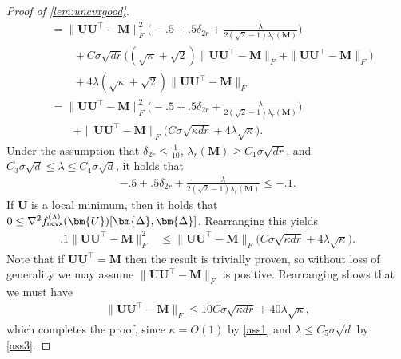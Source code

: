 \documentclass[10pt]{article}
\renewcommand{\t}{^{\top}}
\theoremstyle{definition}
\begin{document}
\begin{proof}[Proof of \cref{lem:uncvxgood}]
\begin{align}
     &= \| \bm{UU}\t - \bm{M} \|_F^2 \bigg( - .5 + .5 \delta_{2r} + \frac{\lambda}{2 (\sqrt{2} - 1) \lambda_r(\bm{M})} \bigg)  \\
     &\qquad + C \sigma \sqrt{dr} \bigg( (\sqrt{\kappa} + \sqrt{2}) \| \bm{UU}\t - \bm{M} \|_F + \| \bm{UU}\t - \bm{M} \|_F\bigg) \\
     &\qquad +  4 \lambda(\sqrt{\kappa} + \sqrt{2}) \| \bm{UU}\t - \bm{M} \|_F \\
     &= \| \bm{UU}\t - \bm{M} \|_F^2 \bigg( - .5 + .5 \delta_{2r} + \frac{\lambda}{2 (\sqrt{2} - 1) \lambda_r(\bm{M})} \bigg) \\
     &\qquad + \| \bm{UU}\t - \bm{M} \|_F \bigg( C \sigma  \sqrt{\kappa dr} +  4 \lambda \sqrt{\kappa} \bigg).
     \end{align}
 Under the assumption that $\delta_{2r} \leq \frac{1}{10}$, $\lambda_r(\bm{M}) \geq C_1 \sigma \sqrt{dr}$, and $C_3 \sigma \sqrt{d} \leq \lambda \leq C_4 \sigma \sqrt{d}$, it holds that
 \begin{align}
     - .5 + .5 \delta_{2r} + \frac{\lambda}{2 (\sqrt{2} - 1) \lambda_r(\bm{M})}  \leq - .1.
 \end{align}
    If $\bm{U}$ is a local minimum, then it holds that $0 \leq \nabla^2 f^{(\lambda)}_{{\sf ncvx}}(\bm{U})[ \bm{\Delta},\bm{\Delta}]$.  
         Rearranging this yields
     \begin{align}
       .1  \| \bm{UU}\t - \bm{M} \|_F^2 &\leq \| \bm{UU}\t - \bm{M} \|_F\bigg( C \sigma  \sqrt{\kappa dr} +  4 \lambda \sqrt{\kappa} \bigg).
     \end{align}
     Note that if $\bm{UU}\t = \bm{M}$ then the result is trivially proven, so without loss of generality we may assume $\|\bm{UU}\t - \bm{M} \|_F$ is positive.  Rearranging shows that we must have
     \begin{align}
         \| \bm{UU}\t - \bm{M} \|_F \leq 10 C \sigma \sqrt{\kappa dr} + 40 \lambda \sqrt{\kappa}, 
     \end{align}
    which completes the proof, since $\kappa = O(1)$ by \cref{ass1} and $\lambda \leq C_5 \sigma \sqrt{d}$ by \cref{ass3}.
\end{proof}
\end{document}
